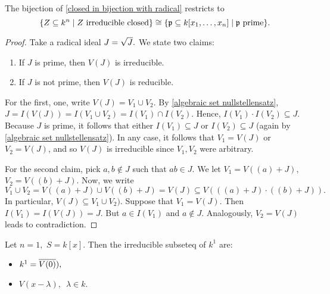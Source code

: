 \begin{prop}
  \label{prime irreducible}
  The bijection of \cref{closed in bijection with radical} restricts to
  \[\{Z \subseteq k^n \mathrel{|} \text{$Z$ irreducible closed}\} \cong \{\mathfrak p \subseteq k[x_1, \dotsc, x_n] \mathrel{|} \text{$\mathfrak p $ prime}\}.\]
\end{prop}
\begin{proof}
  Take a radical ideal \(J = \sqrt{J}.\) We state two claims:
  \begin{enumerate}
  \item If \(J\) is prime, then \(V(J)\) is irreducible.
  \item If \(J\) is not prime, then \(V(J)\) is reducible.
  \end{enumerate}
  For the first, one, write \(V(J) = V_1 \cup V_2.\) By \cref{algebraic set nullstellensatz},
  \(J = I(V(J)) = I(V_1 \cup V_2) = I(V_1) \cap I(V_2).\)
  Hence,
  \(I(V_1) \cdot I(V_2) \subseteq J.\)
  Because \(J\) is prime, it follows that either \(I(V_1) \subseteq J\) or \(I(V_2) \subseteq J\) (again by \cref{algebraic set nullstellensatz}).
  In any case, it follows that \(V_1 = V(J)\) or \(V_2 = V(J)\), and so \(V(J)\) is irreducible since \(V_1, V_2\) were arbitrary.

  For the second claim, pick \(a, b \notin J\) such that \(ab \in J\). We let
  \(V_1 = V((a) + J),\)
  \(V_2 = V((b) + J).\)
  Now, we write
  \[V_1 \cup V_2 = V((a) + J) \cup V((b) + J) = V(J) \subseteq V(((a) + J) \cdot ((b) + J)).\]
  In particular,
  \(V(J) \subseteq V_1 \cup V_2).\)
  Suppose that
  \(V_1 = V(J).\) Then \(I(V_1) = I(V(J)) = J.\)
  But \(a \in I(V_1)\) and \(a \notin J\).
  Analogously, \(V_2 = V(J)\) leads to contradiction.
\end{proof}


\begin{example}
  Let \(n = 1,\) \(S = k[x].\) Then the irreducible subseteq of \(k^1\) are:
  \begin{itemize}
  \item \(k^1 = \overline{V(0)}),\)
  \item \(V(x-\lambda), \enspace \lambda \in k.\)
  \end{itemize}
\end{example}

